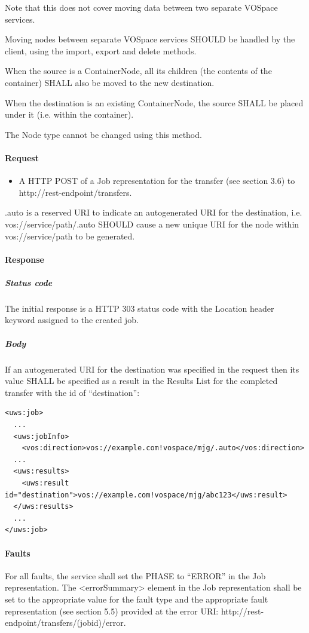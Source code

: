\documentclass[11pt,a4paper]{ivoa}
\begin{document}
Note that this does not cover moving data between two separate VOSpace services.

Moving nodes between separate VOSpace services SHOULD be handled by the client, using the import, export and delete methods.

When the source is a ContainerNode, all its children (the contents of the container) SHALL also be moved to the new destination.

When the destination is an existing ContainerNode, the source SHALL be placed under it (i.e. within the container).

The Node type cannot be changed using this method.

\paragraph{Request}
\begin{itemize}
    \item A HTTP POST of a Job representation for the transfer (see section 3.6) to http://rest-endpoint/transfers.
\end{itemize}

.auto is a reserved URI to indicate an autogenerated URI for the destination, i.e. vos://service/path/.auto SHOULD cause a new unique URI for the node within vos://service/path to be generated.

\paragraph{Response}
\subparagraph{Status code} The initial response is a HTTP 303 status code with the Location header keyword assigned to the created job.
\subparagraph{Body}
If an autogenerated URI for the destination was specified in the request then its value SHALL be specified as a result in the Results List for the completed transfer with the id of ``destination'':
\begin{lstlisting}
<uws:job>
  ...
  <uws:jobInfo>
    <vos:direction>vos://example.com!vospace/mjg/.auto</vos:direction>
  ...
  <uws:results>
    <uws:result id="destination">vos://example.com!vospace/mjg/abc123</uws:result>
  </uws:results>
  ...
</uws:job>
\end{lstlisting}

\paragraph{Faults}

For all faults, the service shall set the PHASE to ``ERROR'' in the Job representation. The <errorSummary> element in the Job representation shall be set to the appropriate value for the fault type and the appropriate fault representation (see section 5.5) provided at the error URI: http://rest-endpoint/transfers/(jobid)/error.
\end{document}
